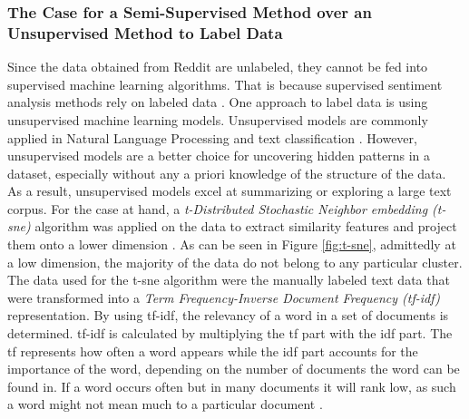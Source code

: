 \documentclass[11pt, a4paper]{article}
\begin{document}
\subsubsection{The Case for a Semi-Supervised Method over an Unsupervised Method to Label Data}
Since the data obtained from Reddit are unlabeled, they cannot be fed into supervised machine learning algorithms. 
That is because supervised sentiment analysis methods rely on labeled data \citep{sazzed2021ssentia}. One approach to label 
data is using unsupervised machine learning models. Unsupervised models are commonly applied in Natural Language Processing 
and text classification \citep{jung2019automatedclassification}. However, unsupervised models are a better choice for uncovering hidden 
patterns in a dataset, especially without any a priori knowledge of the structure of the data. As a result, unsupervised models 
excel at summarizing or exploring a large text corpus. 
For the case at hand, a \emph{t-Distributed Stochastic Neighbor embedding (t-sne)} algorithm was applied on the data to extract similarity 
features and project them onto a lower dimension \citep{binu2020dimreductiontsne}. As can be seen in Figure \ref{fig:t-sne}, admittedly 
at a low dimension, the majority of the data do not belong to any particular cluster.
The data used for the t-sne algorithm were the
manually labeled text data that were transformed into a \emph{Term Frequency-Inverse Document Frequency (tf-idf)} representation.
By using tf-idf, the relevancy of a word in a set of documents is determined. tf-idf is calculated by multiplying the tf part with the
idf part. The tf represents how often a word appears while the idf part accounts for the importance of the word, depending on
the number of documents the word can be found in.
If a word occurs often but in many documents
it will rank low, as such a word might not mean much to a particular document \citep{Guia2019ComparisonON, jason2021tfidf}.
\end{document}
